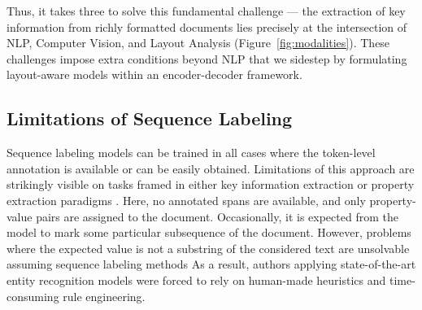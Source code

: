 \documentclass[runningheads]{llncs}
\begin{document}
Thus, it takes three to solve this fundamental challenge --- the extraction of key information from richly formatted documents lies precisely at the intersection of NLP, Computer Vision, and Layout Analysis (Figure~\ref{fig:modalities}).
These challenges impose extra conditions beyond NLP that we sidestep by formulating layout-aware models within an encoder-decoder framework.






\subsection{Limitations of Sequence Labeling}
Sequence labeling models can be trained in all cases where the token-level annotation is available or can be easily obtained. Limitations of this approach are strikingly visible on tasks framed in either key information extraction or property extraction paradigms \cite{Huang2019ICDAR2019CO,dwojak-etal-2020-dataset}. Here, no annotated spans are available, and only property-value pairs are assigned to the document. Occasionally, it is expected from the model to mark some particular subsequence of the document. However, problems where the expected value is not a substring of the considered text are unsolvable assuming sequence labeling methods As a result, authors applying state-of-the-art entity recognition models were forced to rely on human-made heuristics and time-consuming rule engineering.


\end{document}

